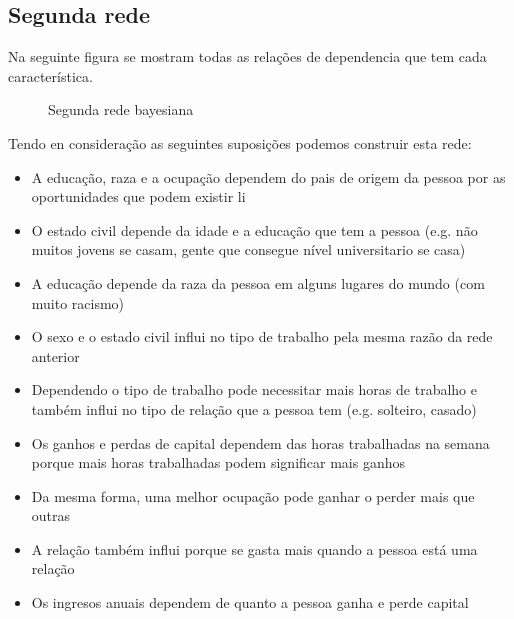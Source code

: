 \subsection{Segunda rede}
	Na seguinte figura se mostram todas as relações de dependencia que tem cada característica.
	\begin{figure}[H]
		\centering
		
		\caption{Segunda rede bayesiana}
		\label{fig:rede2}
	\end{figure}
	Tendo en consideração as seguintes suposições podemos construir esta rede:
	\begin{itemize}
		\item A educação, raza e a ocupação dependem do pais de origem da pessoa por as oportunidades que podem existir li
		\item O estado civil depende da idade e a educação que tem a pessoa (e.g. não muitos jovens se casam, gente que consegue nível universitario se casa)
		\item A educação depende da raza da pessoa em alguns lugares do mundo (com muito racismo)
		\item O sexo e o estado civil influi no tipo de trabalho pela mesma razão da rede anterior
		\item Dependendo o tipo de trabalho pode necessitar mais horas de trabalho e também influi no tipo de relação que a pessoa tem (e.g. solteiro, casado)
		\item Os ganhos e perdas de capital dependem das horas trabalhadas na semana porque mais horas trabalhadas podem significar mais ganhos
		\item Da mesma forma, uma melhor ocupação pode ganhar o perder mais que outras
		\item A relação também influi porque se gasta mais quando a pessoa está uma relação
		\item Os ingresos anuais dependem de quanto a pessoa ganha e perde capital
	\end{itemize}

